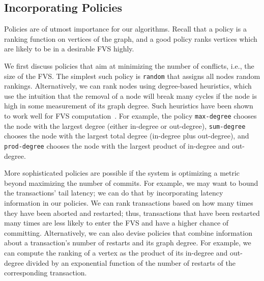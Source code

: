 \subsection{Incorporating Policies}
\label{subsec:validator_reordering:policy}

Policies are of utmost importance for our algorithms. Recall that a policy is a ranking function on vertices of the graph, and a good policy ranks vertices which are likely to be in a desirable FVS highly. 

We first discuss policies that aim at minimizing the number of conflicts, i.e., the size of the FVS. The simplest such policy is \texttt{random} that assigns all nodes random rankings. Alternatively, we can rank nodes using degree-based heuristics, which use the intuition that the removal of a node will break many cycles if the node is high in some measurement of its graph degree. Such heuristics have  been shown to work well for FVS computation~\cite{cutello2015targeting}. For example, the policy \texttt{max-degree} chooses the node with the largest degree (either in-degree or out-degree), \texttt{sum-degree} chooses the node with the largest total degree (in-degree plus out-degree), and \texttt{prod-degree} chooses the node with the largest product of in-degree and out-degree. 

More sophisticated policies are possible if the system is optimizing a metric beyond maximizing the number of commits. For example, we may want to bound the transactions' tail latency; we can do that by incorporating latency information in our policies. We can rank transactions based on how many times they have been aborted and restarted; thus, transactions that have been restarted many times are less likely to enter the FVS and have a higher chance of committing.  Alternatively, we can also devise policies that combine information about a transaction's number of restarts and its graph degree. For example, we can compute the ranking of a vertex as the product of its in-degree and out-degree divided by an exponential function of the number of restarts of the corresponding transaction. 


